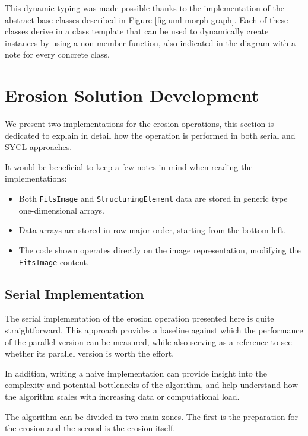 This dynamic typing was made possible thanks to the implementation of the abstract base classes described in Figure \ref{fig:uml-morph-graph}.
Each of these classes derive in a class template that can be used to dynamically create instances by using a non-member function, also indicated in the diagram with a note for every concrete class.

\section{Erosion Solution Development}

We present two implementations for the erosion operations, this section is dedicated to explain in detail how the operation is performed in both serial and SYCL approaches.

It would be beneficial to keep a few notes in mind when reading the implementations:
\begin{itemize}
    \item Both \texttt{FitsImage} and \texttt{StructuringElement} data are stored in generic type one-dimensional arrays.
    \item Data arrays are stored in row-major order, starting from the bottom left.
    \item The code shown operates directly on the image representation, modifying the \texttt{FitsImage} content.
\end{itemize}

\subsection{Serial Implementation}

The serial implementation of the erosion operation presented here is quite straightforward.
This approach provides a baseline against which the performance of the parallel version can be measured, while also serving as a reference to see whether its parallel version is worth the effort.

In addition, writing a naive implementation can provide insight into the complexity and potential bottlenecks of the algorithm, and help understand how the algorithm scales with increasing data or computational load.

The algorithm can be divided in two main zones.
The first is the preparation for the erosion and the second is the erosion itself.
\pagebreak



